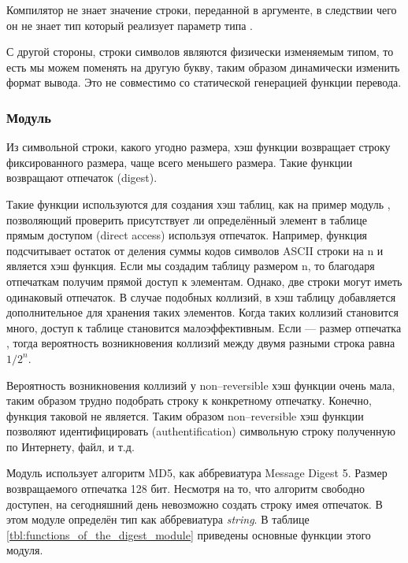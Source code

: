 Компилятор не знает значение строки, переданной в аргументе, в следствии чего он 
не знает тип который реализует параметр  типа .

С другой стороны, строки символов являются физически изменяемым типом, то есть 
мы можем поменять  на другую букву, таким образом динамически 
изменить формат вывода. Это не совместимо со статической генерацией функции 
перевода.

\subsubsection{Модуль }
\label{subsubsec:module_digest}

Из символьной строки, какого угодно размера, хэш функции возвращает строку 
фиксированного размера, чаще всего меньшего размера. Такие функции возвращают 
отпечаток (digest).

Такие функции используются для создания хэш таблиц, как на пример модуль 
, позволяющий проверить присутствует ли определённый элемент в 
таблице прямым доступом (direct access) используя отпечаток. Например, функция 
 подсчитывает остаток от деления суммы кодов символов ASCII 
строки на n и является хэш функция. Если мы создадим таблицу размером n, то 
благодаря отпечаткам получим прямой доступ к элементам. Однако, две строки могут 
иметь одинаковый отпечаток. В случае подобных коллизий, в хэш таблицу 
добавляется дополнительное  для хранения таких элементов. Когда 
таких коллизий становится много, доступ к таблице становится малоэффективным. 
Если  --- размер отпечатка , тогда вероятность возникновения 
коллизий между двумя разными строка равна $1/2^n$.

Вероятность возникновения коллизий у non--reversible хэш функции очень мала, 
таким образом трудно подобрать строку к конкретному отпечатку. Конечно, функция 
 таковой не является. Таким образом non--reversible хэш функции 
позволяют идентифицировать (authentification) символьную строку полученную по 
Интернету, файл, и т.д.

Модуль  использует алгоритм MD5, как аббревиатура Message Digest 
5. Размер возвращаемого отпечатка 128 бит. Несмотря на то, что алгоритм 
свободно доступен, на сегодняшний день невозможно создать строку имея отпечаток. 
В этом модуле определён тип  как аббревиатура {\it string}. В 
таблице \ref{tbl:functions_of_the_digest_module} приведены основные функции 
этого модуля.

